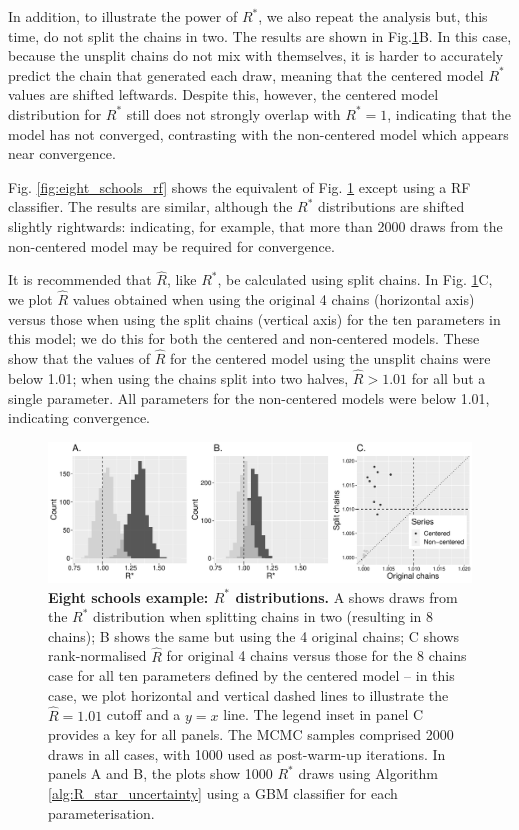 \documentclass[ba]{imsart}
\numberwithin{equation}{section}
\theoremstyle{plain}
\begin{document}
In addition, to illustrate the power of $R^*$, we also repeat the analysis but, this time, do not split the chains in two. The results are shown in Fig.\ref{fig:eight_schools}B. In this case, because the unsplit chains do not mix with themselves, it is harder to accurately predict the chain that generated each draw, meaning that the centered model $R^*$ values are shifted leftwards. Despite this, however, the centered model distribution for $R^*$ still does not strongly overlap with $R^*=1$, indicating that the model has not converged, contrasting with the non-centered model which appears near convergence.

Fig. \ref{fig:eight_schools_rf} shows the equivalent of Fig. \ref{fig:eight_schools} except using a RF classifier. The results are similar, although the $R^*$ distributions are shifted slightly rightwards: indicating, for example, that more than 2000 draws from the non-centered model may be required for convergence.

It is recommended that $\widehat{R}$, like $R^*$, be calculated using split chains. In Fig. \ref{fig:eight_schools}C, we plot $\widehat{R}$ values obtained when using the original 4 chains (horizontal axis) versus those when using the split chains (vertical axis) for the ten parameters in this model; we do this for both the centered and non-centered models. These show that the values of $\widehat{R}$ for the centered model using the unsplit chains were below 1.01; when using the chains split into two halves, $\widehat{R}>1.01$ for all but a single parameter. All parameters for the non-centered models were below 1.01, indicating convergence.

\begin{figure}[!htb]
	\centerline{\includegraphics[width=1.0\textwidth]{eight_schools.pdf}}
	\caption{\textbf{Eight schools example: $R^*$ distributions.} A shows draws from the $R^*$ distribution when splitting chains in two (resulting in 8 chains); B shows the same but using the 4 original chains; C shows rank-normalised $\widehat{R}$ for original 4 chains versus those for the 8 chains case for all ten parameters defined by the centered model -- in this case, we plot horizontal and vertical dashed lines to illustrate the $\widehat{R}=1.01$ cutoff and a $y=x$ line. The legend inset in panel C provides a key for all panels. The MCMC samples comprised 2000 draws in all cases, with 1000 used as post-warm-up iterations. In panels A and B, the plots show 1000 $R^*$ draws using Algorithm \ref{alg:R_star_uncertainty} using a GBM classifier for each parameterisation.}
	\label{fig:eight_schools}
\end{figure}
\end{document}
